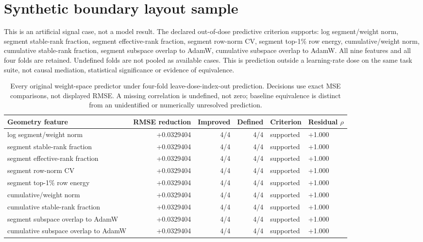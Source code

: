 \documentclass[11pt]{article}
\newcommand{\CorrectedGeometryBridgeFinding}{The declared out-of-dose predictive criterion supports: log segment/weight norm, segment stable-rank fraction, segment effective-rank fraction, segment row-norm CV, segment top-1\% row energy, cumulative/weight norm, cumulative stable-rank fraction, segment subspace overlap to AdamW, cumulative subspace overlap to AdamW. All nine features and all four folds are retained. Undefined folds are not pooled as available cases. This is prediction outside a learning-rate dose on the same task suite, not causal mediation, statistical significance or evidence of equivalence.}
\newcommand{\CorrectedGeometryBridgeTable}{%
\begin{table}[t]
\centering\small
\begin{tabular}{lrrrll}\toprule
Geometry feature & RMSE reduction & Improved & Defined & Criterion & Residual $\rho$ \\
\midrule
log segment/weight norm & +0.0329404 & 4/4 & 4/4 & supported & +1.000 \\
segment stable-rank fraction & +0.0329404 & 4/4 & 4/4 & supported & +1.000 \\
segment effective-rank fraction & +0.0329404 & 4/4 & 4/4 & supported & +1.000 \\
segment row-norm CV & +0.0329404 & 4/4 & 4/4 & supported & +1.000 \\
segment top-1\% row energy & +0.0329404 & 4/4 & 4/4 & supported & +1.000 \\
cumulative/weight norm & +0.0329404 & 4/4 & 4/4 & supported & +1.000 \\
cumulative stable-rank fraction & +0.0329404 & 4/4 & 4/4 & supported & +1.000 \\
segment subspace overlap to AdamW & +0.0329404 & 4/4 & 4/4 & supported & +1.000 \\
cumulative subspace overlap to AdamW & +0.0329404 & 4/4 & 4/4 & supported & +1.000 \\
\bottomrule\end{tabular}
\caption{Every original weight-space predictor under four-fold leave-dose-index-out prediction. Decisions use exact MSE comparisons, not displayed RMSE. A missing correlation is undefined, not zero; baseline equivalence is distinct from an unidentified or numerically unresolved prediction.}
\label{tab:corrected-bridge}
\end{table}%
}
\begin{document}
\section*{Synthetic boundary layout sample}
This is an artificial signal case, not a model result.
\CorrectedGeometryBridgeFinding
\CorrectedGeometryBridgeTable
\end{document}

